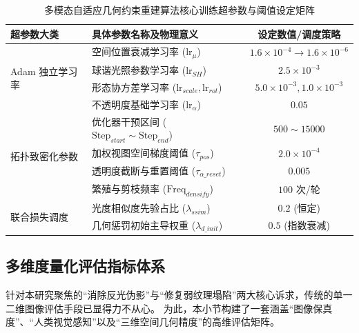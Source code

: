 \begin{table}[htbp]
    \centering
    \caption{多模态自适应几何约束重建算法核心训练超参数与阈值设定矩阵}
    \vspace{0.2cm}
    \begin{tabular}{llc}
        \toprule
        \textbf{超参数大类} & \textbf{具体参数名称及物理意义} & \textbf{设定数值/调度策略} \\
        \midrule
        \multirow{4}{*}{Adam 独立学习率} & 空间位置衰减学习率 ($\text{lr}_{\mu}$) & $1.6\times10^{-4} \to 1.6\times10^{-6}$ \\
        & 球谐光照参数学习率 ($\text{lr}_{SH}$) & $2.5\times10^{-3}$ \\
        & 形态协方差学习率 ($\text{lr}_{scale}, \text{lr}_{rot}$) & $5.0\times10^{-3}, 1.0\times10^{-3}$ \\
        & 不透明度基础学习率 ($\text{lr}_{\alpha}$) & $0.05$ \\
        \midrule
        \multirow{4}{*}{拓扑致密化参数} & 优化器干预区间 ($\text{Step}_{start} \sim \text{Step}_{end}$) & $500 \sim 15000$ \\
        & 加权视图空间梯度阈值 ($\tau_{pos}$) & $2.0 \times 10^{-4}$ \\
        & 透明度截断与重置阈值 ($\tau_{\alpha\_reset}$) & $0.005$ \\
        & 繁殖与剪枝频率 ($\text{Freq}_{densify}$) & $100$ 次/轮 \\
        \midrule
        \multirow{2}{*}{联合损失调度} & 光度相似度先验占比 ($\lambda_{ssim}$) & $0.2$ (恒定) \\
        & 几何惩罚初始主导权重 ($\lambda_{d\_init}$) & $0.5$ (指数衰减) \\
        \bottomrule
    \end{tabular}
    \label{tab:hyperparameters_detail}
\end{table}

\subsection{多维度量化评估指标体系}
\label{subsec:evaluation_metrics}

针对本研究聚焦的“消除反光伪影”与“修复弱纹理塌陷”两大核心诉求，传统的单一二维图像评估手段已显得力不从心。
为此，本小节构建了一套涵盖“图像保真度”、“人类视觉感知”以及“三维空间几何精度”的高维评估矩阵。

